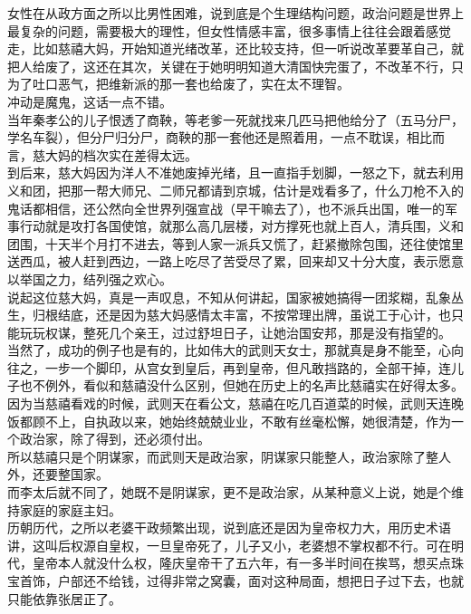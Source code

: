\begin{multicols}{\theparacolNo}
女性在从政方面之所以比男性困难，说到底是个生理结构问题，政治问题是世界上最复杂的问题，需要极大的理性，但女性情感丰富，很多事情上往往会跟着感觉走，比如慈禧大妈，开始知道光绪改革，还比较支持，但一听说改革要革自己，就把人给废了，这还在其次，关键在于她明明知道大清国快完蛋了，不改革不行，只为了吐口恶气，把维新派的那一套也给废了，实在太不理智。\\

冲动是魔鬼，这话一点不错。\\

当年秦孝公的儿子恨透了商鞅，等老爹一死就找来几匹马把他给分了（五马分尸，学名车裂），但分尸归分尸，商鞅的那一套他还是照着用，一点不耽误，相比而言，慈大妈的档次实在差得太远。\\

到后来，慈大妈因为洋人不准她废掉光绪，且一直指手划脚，一怒之下，就去利用义和团，把那一帮大师兄、二师兄都请到京城，估计是戏看多了，什么刀枪不入的鬼话都相信，还公然向全世界列强宣战（早干嘛去了），也不派兵出国，唯一的军事行动就是攻打各国使馆，就那么高几层楼，对方撑死也就上百人，清兵围，义和团围，十天半个月打不进去，等到人家一派兵又慌了，赶紧撤除包围，还往使馆里送西瓜，被人赶到西边，一路上吃尽了苦受尽了累，回来却又十分大度，表示愿意以举国之力，结列强之欢心。\\

说起这位慈大妈，真是一声叹息，不知从何讲起，国家被她搞得一团浆糊，乱象丛生，归根结底，还是因为慈大妈感情太丰富，不按常理出牌，虽说工于心计，也只能玩玩权谋，整死几个亲王，过过舒坦日子，让她治国安邦，那是没有指望的。\\

当然了，成功的例子也是有的，比如伟大的武则天女士，那就真是身不能至，心向往之，一步一个脚印，从宫女到皇后，再到皇帝，但凡敢挡路的，全部干掉，连儿子也不例外，看似和慈禧没什么区别，但她在历史上的名声比慈禧实在好得太多。\\

因为当慈禧看戏的时候，武则天在看公文，慈禧在吃几百道菜的时候，武则天连晚饭都顾不上，自执政以来，她始终兢兢业业，不敢有丝毫松懈，她很清楚，作为一个政治家，除了得到，还必须付出。\\

所以慈禧只是个阴谋家，而武则天是政治家，阴谋家只能整人，政治家除了整人外，还要整国家。\\

而李太后就不同了，她既不是阴谋家，更不是政治家，从某种意义上说，她是个维持家庭的家庭主妇。\\

历朝历代，之所以老婆干政频繁出现，说到底还是因为皇帝权力大，用历史术语讲，这叫后权源自皇权，一旦皇帝死了，儿子又小，老婆想不掌权都不行。可在明代，皇帝本人就没什么权，隆庆皇帝干了五六年，有一多半时间在挨骂，想买点珠宝首饰，户部还不给钱，过得非常之窝囊，面对这种局面，想把日子过下去，也就只能依靠张居正了。\\


\end{multicols}
